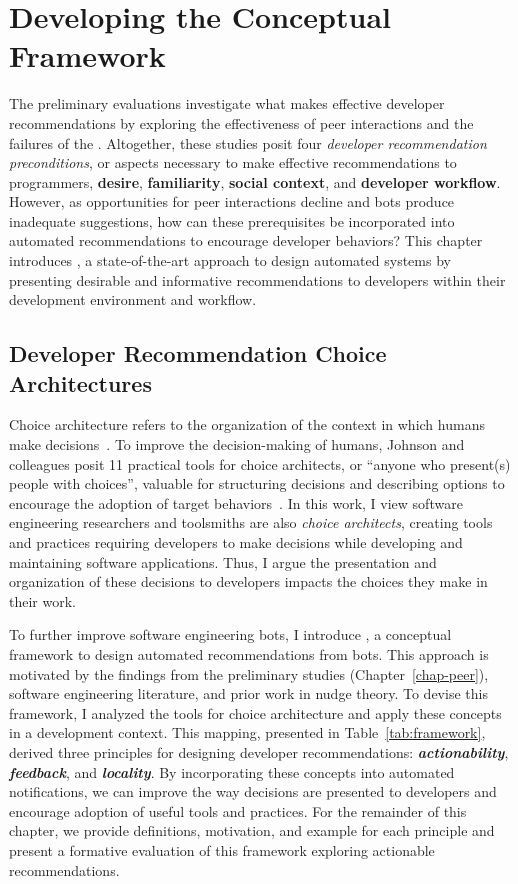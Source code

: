\chapter{Developing the Conceptual Framework}
\label{chap-framework}

The preliminary evaluations investigate what makes effective developer recommendations by exploring the effectiveness of peer interactions and the failures of the \tele. Altogether, these studies posit four \textit{developer recommendation preconditions}, or aspects necessary to make effective recommendations to programmers, \textbf{desire}, \textbf{familiarity}, \textbf{social context}, and \textbf{developer workflow}. However, as opportunities for peer interactions decline and bots produce inadequate suggestions, how can these prerequisites be incorporated into automated recommendations to encourage developer behaviors? This chapter introduces \FRAMEWORK, a state-of-the-art approach to design automated systems by presenting desirable and informative recommendations to developers within their development environment and workflow.


\section{Developer Recommendation Choice Architectures}

Choice architecture refers to the organization of the context in which humans make decisions~\cite{thaler2013choice}. To improve the decision-making of humans, Johnson and colleagues posit 11 practical tools for choice architects, or ``anyone who present(s) people with choices'', valuable for structuring decisions and describing options to encourage the adoption of target behaviors~\cite{johnson2012beyond}. In this work, I view software engineering researchers and toolsmiths are also \textit{choice architects}, creating tools and practices requiring developers to make decisions while developing and maintaining software applications. Thus, I argue the presentation and organization of these decisions to developers impacts the choices they make in their work.


To further improve software engineering bots, I introduce \FRAMEWORK, a conceptual framework to design automated recommendations from bots. This approach is motivated by the findings from the preliminary studies (Chapter~\ref{chap-peer}), software engineering literature, and prior work in nudge theory. To devise this framework, I analyzed the tools for choice architecture and apply these concepts in a development context. This mapping, presented in Table~\ref{tab:framework}, derived three principles for designing developer recommendations: \textbf{\em actionability}, \textbf{\em feedback}, and \textbf{\em locality}. By incorporating these concepts into automated notifications, we can improve the way decisions are presented to developers and encourage adoption of useful tools and practices. For the remainder of this chapter, we provide definitions, motivation, and example for each principle and present a formative evaluation of this framework exploring actionable recommendations.

